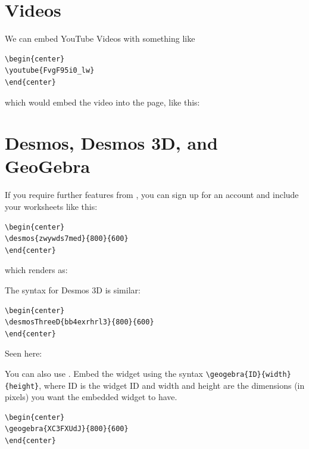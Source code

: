 \documentclass{ximera}
\begin{document}
\section{Videos}

We can embed YouTube Videos with something like
\begin{example}
  \begin{verbatim}
\begin{center}
\youtube{FvgF95i0_lw}
\end{center}
\end{verbatim}
\end{example}

which would embed the video into the page, like this:
\begin{center}
\end{center}

\section{Desmos, Desmos 3D, and GeoGebra}

If you require further features from
, you can sign up for an account
and include your worksheets like this:
\begin{example}
  \begin{verbatim}
\begin{center}
\desmos{zwywds7med}{800}{600}
\end{center}
\end{verbatim}
\end{example}
which renders as:
\begin{center}
\end{center}

The syntax for Desmos 3D is similar:
\begin{example}
  \begin{verbatim}
\begin{center}
\desmosThreeD{bb4exrhrl3}{800}{600}
\end{center}
\end{verbatim}
\end{example}
Seen here:
\begin{center}
\end{center}

You can also use . Embed the
widget using the syntax \verb|\geogebra{ID}{width}{height}|, where ID
is the widget ID and width and height are the dimensions (in pixels)
you want the embedded widget to have.
\begin{example}
  \begin{verbatim}
\begin{center}
\geogebra{XC3FXUdJ}{800}{600}
\end{center}
\end{verbatim}
\end{example}
\begin{center}
\end{center}
\end{document}
